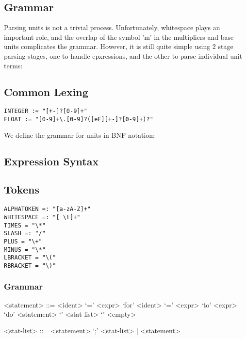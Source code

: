 \documentclass{article}
\begin{document}
\newpage
\subsection*{Grammar}

Parsing units is not a trivial process. Unfortunately, whitespace plays an important role, and the overlap of the symbol 'm' in the multipliers and base units complicates the grammar. However, it is still quite simple using  2 stage parsing stages, one to handle epxressions, and the other to parse individual unit terms:


\subsection*{Common Lexing}

\begin{verbatim}
INTEGER := "[+-]?[0-9]+"
FLOAT := "[0-9]+\.[0-9]?([eE][+-]?[0-9]+)?"
\end{verbatim}

We define the grammar for units in BNF notation:

\subsection*{Expression Syntax}
\subsection*{Tokens}
\begin{verbatim}
ALPHATOKEN =: "[a-zA-Z]+"
WHITESPACE =: "[ \t]+"
TIMES = "\*"
SLASH =: "/"
PLUS = "\+"
MINUS = "\*"
LBRACKET = "\("
RBRACKET = "\)"
\end{verbatim}

\setlength{\grammarparsep}{20pt plus 1pt minus 1pt} %
\setlength{\grammarindent}{12em} %

\subsubsection*{Grammar}

\begin{grammar}

<statement> ::= <ident> `=' <expr> 
\alt `for' <ident> `=' <expr> `to' <expr> `do' <statement> 
\alt `{' <stat-list> `}' 
\alt <empty> 

<stat-list> ::= <statement> `;' <stat-list> | <statement> 

\end{grammar}
\end{document}
